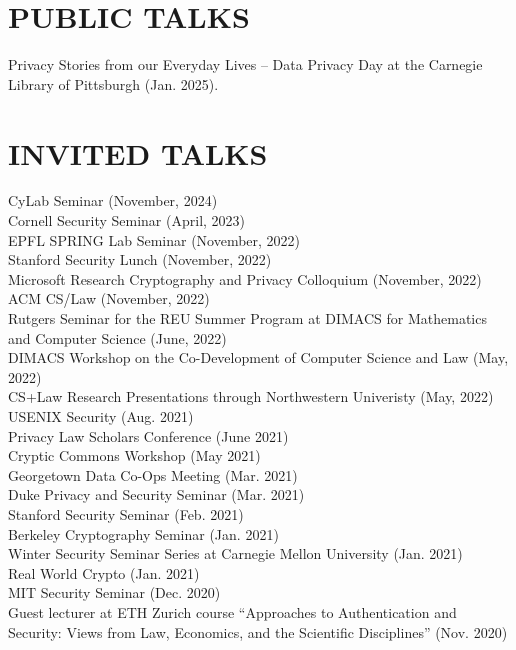 \documentclass{res}
\begin{document}
\begin{resume}
\section{PUBLIC TALKS}  
\vspace{0.1in}
Privacy Stories from our Everyday Lives -- Data Privacy Day at the Carnegie Library of Pittsburgh (Jan. 2025). \\

\section{INVITED TALKS}
\vspace{0.1in}
CyLab Seminar (November, 2024) \\
Cornell Security Seminar (April, 2023) \\
EPFL SPRING Lab Seminar (November, 2022) \\
Stanford Security Lunch (November, 2022) \\
Microsoft Research Cryptography and Privacy Colloquium (November, 2022) \\
ACM CS/Law (November, 2022) \\
Rutgers Seminar for the REU Summer Program at DIMACS for Mathematics and Computer Science (June, 2022) \\
DIMACS Workshop on the Co-Development of Computer Science and Law (May, 2022) \\
CS+Law Research Presentations through Northwestern Univeristy (May, 2022) \\
USENIX Security (Aug. 2021) \\
Privacy Law Scholars Conference (June 2021) \\
Cryptic Commons Workshop (May 2021) \\
Georgetown Data Co-Ops Meeting (Mar. 2021) \\
Duke Privacy and Security Seminar (Mar. 2021) \\
Stanford Security Seminar (Feb. 2021) \\
Berkeley Cryptography Seminar (Jan. 2021) \\
Winter Security Seminar Series at Carnegie Mellon University (Jan. 2021) \\
Real World Crypto (Jan. 2021) \\
MIT Security Seminar (Dec. 2020) \\
Guest lecturer at ETH Zurich course ``Approaches to Authentication and Security: Views from Law,
Economics, and the Scientific Disciplines'' (Nov. 2020) \\

\end{resume}
\end{document}
